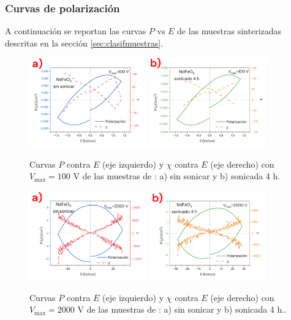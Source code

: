\documentclass[../main.tex]{subfiles}
\begin{document}
\subsubsection{Curvas de polarización}
A continuación se reportan las curvas $P$ vs $E$ de las muestras sinterizadas descritas en la sección \ref{sec:clasifmuestras}.
\begin{figure}[H]
    \centering
    \includegraphics[width=0.45\textwidth]{fig/PENdFeO3100V.png}
    \quad
    \includegraphics[width=0.45\textwidth]{fig/PENdFeO3-S100V.png}
    \caption{Curvas $P$ contra $E$ (eje izquierdo) y $\chi$ contra $E$ (eje derecho) con $V_\text{max}=100$ V de las muestras de \neod{}: a) sin sonicar y b) sonicada 4 h.}
    \label{fig:nd100v}
\end{figure}
\begin{figure}[H]
    \centering
    \includegraphics[width=0.45\textwidth]{fig/PENdFeO32000V.png}
    \quad
    \includegraphics[width=0.45\textwidth]{fig/PENdFeO3-S2000V.png}
    \caption{Curvas $P$ contra $E$ (eje izquierdo) y $\chi$ contra $E$ (eje derecho) con $V_\text{max}=2000$ V de las muestras de \neod{}: a) sin sonicar y b) sonicada 4 h..}
    \label{fig:nd2000v}
\end{figure}
\end{document}
